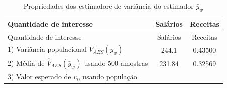 \documentclass[]{book}
\theoremstyle{definition}
\theoremstyle{definition}
\theoremstyle{definition}
\theoremstyle{remark}
\begin{document}
\begin{longtable}[]{@{}lcc@{}}
\caption{\label{tab:varest} Propriedades dos estimadore de variância do
estimador \(\bar{y}_{w}\)}\tabularnewline
\toprule
\begin{minipage}[b]{0.62\columnwidth}\raggedright\strut
Quantidade de interesse\strut
\end{minipage} & \begin{minipage}[b]{0.14\columnwidth}\centering\strut
Salários\strut
\end{minipage} & \begin{minipage}[b]{0.14\columnwidth}\centering\strut
Receitas\strut
\end{minipage}\tabularnewline
\midrule
\endfirsthead
\toprule
\begin{minipage}[b]{0.62\columnwidth}\raggedright\strut
Quantidade de interesse\strut
\end{minipage} & \begin{minipage}[b]{0.14\columnwidth}\centering\strut
Salários\strut
\end{minipage} & \begin{minipage}[b]{0.14\columnwidth}\centering\strut
Receitas\strut
\end{minipage}\tabularnewline
\midrule
\endhead
\begin{minipage}[t]{0.62\columnwidth}\raggedright\strut
1) Variância populacional \(V_{AES}\left( \bar{y}_{w}\right)\)\strut
\end{minipage} & \begin{minipage}[t]{0.14\columnwidth}\centering\strut
244.1\strut
\end{minipage} & \begin{minipage}[t]{0.14\columnwidth}\centering\strut
0.43500\strut
\end{minipage}\tabularnewline
\begin{minipage}[t]{0.62\columnwidth}\raggedright\strut
2) Média de \(\widehat{V}_{AES}\left(\bar{y}_{w}\right)\) usando \(500\)
amostras\strut
\end{minipage} & \begin{minipage}[t]{0.14\columnwidth}\centering\strut
231.84\strut
\end{minipage} & \begin{minipage}[t]{0.14\columnwidth}\centering\strut
0.32569\strut
\end{minipage}\tabularnewline
\begin{minipage}[t]{0.62\columnwidth}\raggedright\strut
3) Valor esperado de \(v_{0}\) usando população\strut
\end{minipage} & \begin{minipage}[t]{0.14\columnwidth}\centering\strut

\end{minipage}
\end{longtable}
\end{document}
